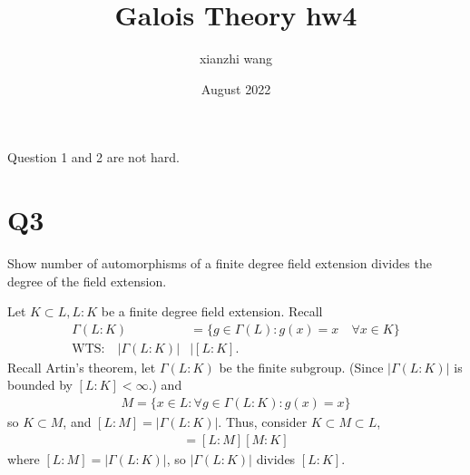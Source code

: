 \documentclass[12pt,english]{article}
\title{Galois Theory hw4}
\author{xianzhi wang}
\date{August 2022}
\begin{document}
\maketitle
Question 1 and 2 are not hard.

\section*{Q3}
\begin{question}
Show number of automorphisms of a finite degree field extension divides the degree of the field extension. 
\end{question}
Let $K \subset L, L:K$ be a finite degree field extension. Recall
\begin{align*}
    \Gamma(L:K) &= \{g \in \Gamma(L): g(x) = x \quad \forall x \in K\}\\
    \text{WTS:} \quad |\Gamma(L:K)| &\mid [L:K].
\end{align*} Recall Artin's theorem, let $\Gamma(L:K)$ be the finite subgroup. (Since $|\Gamma(L:K)|$ is bounded by $[L:K]<\infty$.) and 
\begin{align*}
    M = \{x \in L: \forall g \in \Gamma(L:K): g(x)= x\}
\end{align*} so $K \subset M$, and $[L:M]=|\Gamma(L:K)|$. Thus, consider $K \subset M \subset L$,
\begin{align*}
    [L:K] = [L:M][M:K]
\end{align*} where $[L:M] = |\Gamma(L:K)|$, so $|\Gamma(L:K)|$ divides $[L:K]$.
\end{document}
